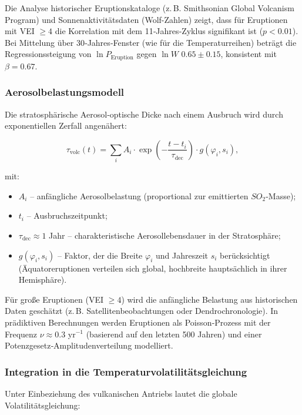 \documentclass[12pt,a4paper]{article}
\begin{document}
	Die Analyse historischer Eruptionskataloge (z. B. Smithsonian Global Volcanism Program) und Sonnenaktivitätsdaten (Wolf-Zahlen) zeigt, dass für Eruptionen mit VEI \(\ge 4\) die Korrelation mit dem 11‑Jahres‑Zyklus signifikant ist (\(p < 0.01\)). Bei Mittelung über 30‑Jahres‑Fenster (wie für die Temperaturreihen) beträgt die Regressionssteigung von \(\ln P_{\text{Eruption}}\) gegen \(\ln W\) \(0.65 \pm 0.15\), konsistent mit \(\beta = 0.67\).
	
	\subsubsection{Aerosolbelastungsmodell}
	
	Die stratosphärische Aerosol‐optische Dicke nach einem Ausbruch wird durch exponentiellen Zerfall angenähert:
	
	\[
	\tau_{\text{volc}}(t) = \sum_{i} A_i \cdot \exp\!\left(-\frac{t-t_i}{\tau_{\text{dec}}}\right) \cdot g(\varphi_i, s_i),
	\]
	
	mit:
	\begin{itemize}
		\item \(A_i\) – anfängliche Aerosolbelastung (proportional zur emittierten \(SO_2\)-Masse);
		\item \(t_i\) – Ausbruchszeitpunkt;
		\item \(\tau_{\text{dec}} \approx 1\) Jahr – charakteristische Aerosollebensdauer in der Stratosphäre;
		\item \(g(\varphi_i, s_i)\) – Faktor, der die Breite \(\varphi_i\) und Jahreszeit \(s_i\) berücksichtigt (Äquatoreruptionen verteilen sich global, hochbreite hauptsächlich in ihrer Hemisphäre).
	\end{itemize}
	
	Für große Eruptionen (VEI \(\ge 4\)) wird die anfängliche Belastung aus historischen Daten geschätzt (z. B. Satellitenbeobachtungen oder Dendrochronologie). In prädiktiven Berechnungen werden Eruptionen als Poisson‑Prozess mit der Frequenz \(\nu \approx 0.3\) yr\(^{-1}\) (basierend auf den letzten 500 Jahren) und einer Potenzgesetz‑Amplitudenverteilung modelliert.
	
	\subsubsection{Integration in die Temperaturvolatilitätsgleichung}
	
	Unter Einbeziehung des vulkanischen Antriebs lautet die globale Volatilitätsgleichung:
	
\end{document}
